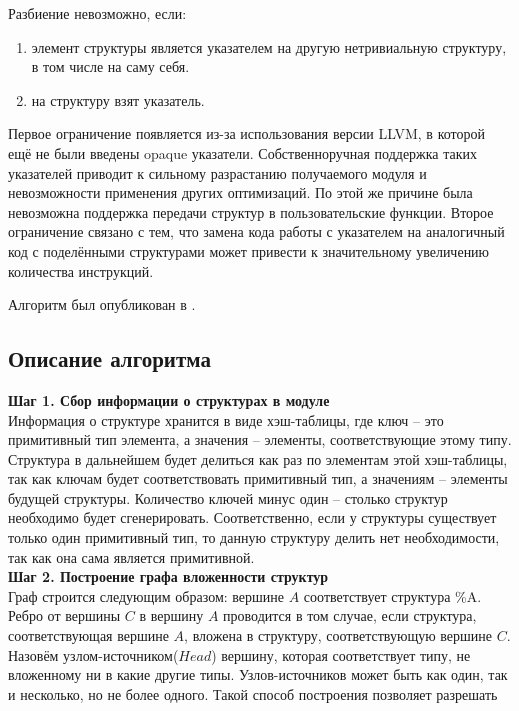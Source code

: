Разбиение невозможно, если:
\begin{enumerate}
\item элемент структуры является указателем на другую нетривиальную структуру, в том числе на саму себя.
\item на структуру взят указатель.
\end{enumerate}

Первое ограничение появляется из-за использования версии LLVM, в которой ещё не были введены opaque указатели.
Собственноручная поддержка таких указателей приводит к сильному разрастанию получаемого модуля и невозможности применения других оптимизаций.
По этой же причине была невозможна поддержка передачи структур в пользовательские функции.
Второе ограничение связано с тем, что замена кода работы с указателем на аналогичный код с поделёнными структурами может привести к значительному увеличению количества инструкций.

Алгоритм был опубликован в \cite{vladimirov2022opt2}.

\subsection{Описание алгоритма}\label{subsec:lowering/splitter/algorithm}

\textbf{Шаг 1. Сбор информации о структурах в модуле}\\

Информация о структуре хранится в виде хэш-таблицы, где ключ -- это примитивный тип элемента, а значения -- элементы, соответствующие этому типу. Структура в дальнейшем будет делиться как раз по элементам этой хэш-таблицы, так как ключам будет соответствовать примитивный тип, а значениям -- элементы будущей структуры. 
Количество ключей минус один -- столько структур необходимо будет сгенерировать.
Соответственно, если у структуры существует только один примитивный тип, то данную структуру делить нет необходимости, так как она сама является примитивной.\\

\textbf{Шаг 2. Построение графа вложенности структур}\\

Граф строится следующим образом: вершине $A$ соответствует структура \%A. Ребро от вершины $C$ в вершину $A$ проводится в том случае, если структура, соответствующая вершине $A$, вложена в структуру, соответствующую вершине $C$. Назовём узлом-источником($Head$) вершину, которая соответствует типу, не вложенному ни в какие другие типы. Узлов-источников может быть как один, так и несколько, но не более одного. Такой способ построения позволяет разрешать 

